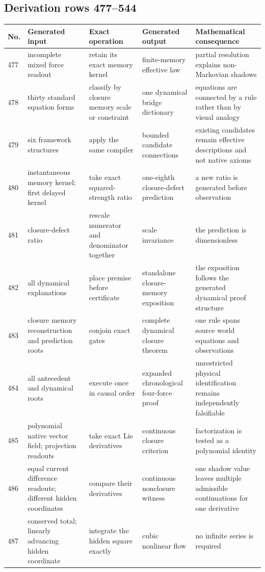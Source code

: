 \documentclass[11pt]{article}
\numberwithin{equation}{section}
\theoremstyle{remark}
\begin{document}
\begin{landscape}
\subsection{Derivation rows 477--544}
\begin{longtable}{p{0.65cm}p{3.5cm}p{4.0cm}p{4.0cm}p{4.6cm}}
\toprule No.&Generated input&Exact operation&Generated output&Mathematical consequence\\\midrule\endhead
477&incomplete mixed force readout&retain its exact memory kernel&finite-memory effective law&partial resolution explains non-Markovian shadows\\
478&thirty standard equation forms&classify by closure memory scale or constraint&one dynamical bridge dictionary&equations are connected by a rule rather than by visual analogy\\
479&six framework structures&apply the same compiler&bounded candidate connections&existing candidates remain effective descriptions and not native axioms\\
480&instantaneous memory kernel; first delayed kernel&take exact squared-strength ratio&one-eighth closure-defect prediction&a new ratio is generated before observation\\
481&closure-defect ratio&rescale numerator and denominator together&scale invariance&the prediction is dimensionless\\
482&all dynamical explanations&place premise before certificate&standalone closure-memory exposition&the exposition follows the generated dynamical proof structure\\
483&closure memory reconstruction and prediction roots&conjoin exact gates&complete dynamical closure theorem&one rule spans source world equations and observations\\
484&all antecedent and dynamical roots&execute once in causal order&expanded chronological four-force proof&unrestricted physical identification remains independently falsifiable\\
485&polynomial native vector field; projection readouts&take exact Lie derivatives&continuous closure criterion&factorization is tested as a polynomial identity\\
486&equal current difference readouts; different hidden coordinates&compare their derivatives&continuous nonclosure witness&one shadow value leaves multiple admissible continuations for one derivative\\
487&conserved total; linearly advancing hidden coordinate&integrate the hidden square exactly&cubic nonlinear flow&no infinite series is required\\

\end{longtable}
\end{landscape}
\end{document}
